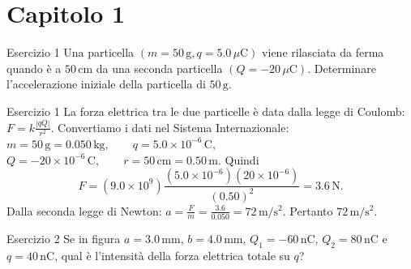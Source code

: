 \documentclass[a4paper]{article}
\begin{document}
\section{Capitolo 1}
\begin{snippetexercise}{Esercizio 1}
    Una particella \((m = 50\,\mathrm{g}, q = 5.0\,\mu\mathrm{C})\)
    viene rilasciata da ferma quando è a \(50\,\mathrm{cm}\) da una seconda
    particella \((Q = -20\,\mu\mathrm{C})\). Determinare l'accelerazione
    iniziale della particella di \(50\,\mathrm{g}\).

\end{snippetexercise}
\begin{snippetsolution}{Esercizio 1}
    La forza elettrica tra le due particelle è data dalla legge di Coulomb:
    \(F = k \frac{|qQ|}{r^2}.\)
    Convertiamo i dati nel Sistema Internazionale:
    \(m = 50\,\mathrm{g} = 0.050\,\mathrm{kg}, \qquad q = 5.0 \times 10^{-6}\,\mathrm{C},\)
    \(Q = -20 \times 10^{-6}\,\mathrm{C}, \qquad r = 50\,\mathrm{cm} = 0.50\,\mathrm{m}.\)
    Quindi
    \[
        F =
        \left(9.0 \times 10^9\right)
        \frac{
            \left(5.0 \times 10^{-6}\right)
            \left(20 \times 10^{-6}\right)
        }{(0.50)^2}
        =
        3.6\,\mathrm{N}.
    \]
    Dalla seconda legge di Newton:
    \(a = \frac{F}{m} = \frac{3.6}{0.050} = 72\,\mathrm{m/s^2}.\)
    Pertanto
    \(\boxed{72\,\mathrm{m/s^2}}.\)
\end{snippetsolution}
\begin{snippetexercise}{Esercizio 2}
    Se in figura \(a = 3.0\,\mathrm{mm}\), \(b = 4.0\,\mathrm{mm}\),
    \(Q_1 = -60\,\mathrm{nC}\), \(Q_2 = 80\,\mathrm{nC}\) e
    \(q = 40\,\mathrm{nC}\), qual è l'intensità della forza elettrica totale
    su \(q\)?
    \begin{center}
    \end{center}

\end{snippetexercise}
\end{document}
